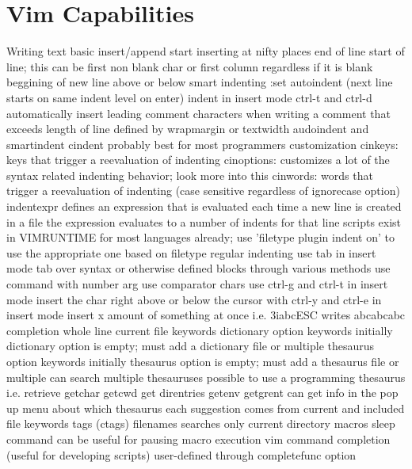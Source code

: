 \documentclass[12pt]{book}
\begin{document}
\section{Vim Capabilities}
Writing text
  basic insert/append
    start inserting at nifty places
      end of line
      start of line; this can be first non blank char or first column regardless if it is blank
      beggining of new line above or below
      smart indenting
        :set autoindent (next line starts on same indent level on enter)
        indent in insert mode ctrl-t and ctrl-d
        automatically insert leading comment characters when writing a comment that exceeds length of line defined by wrapmargin or textwidth
        audoindent and smartindent
        cindent
          probably best for most programmers
          customization
            cinkeys: keys that trigger a reevaluation of indenting
            cinoptions: customizes a lot of the syntax related indenting behavior; look more into this
            cinwords: words that trigger a reevaluation of indenting (case sensitive regardless of ignorecase option)
        indentexpr
          defines an expression that is evaluated each time a new line is created in a file
          the expression evaluates to a number of indents for that line
          scripts exist in VIMRUNTIME for most languages already; use 'filetype plugin indent on' to use the appropriate one based on filetype
      regular indenting
        use tab in insert mode
        tab over syntax or otherwise defined blocks through various methods
        use command with number arg
        use comparator chars
        use ctrl-g and ctrl-t in insert mode
    insert the char right above or below the cursor with ctrl-y and ctrl-e in insert mode
    insert x amount of something at once i.e. 3iabcESC writes abcabcabc
  completion
    whole line
    current file keywords
    dictionary option keywords
      initially dictionary option is empty; must add a dictionary file or multiple
    thesaurus option keywords
      initially thesaurus option is empty; must add a thesaurus file or multiple
      can search multiple thesauruses
      possible to use a programming thesaurus i.e. retrieve getchar getcwd get direntries getenv getgrent
      can get info in the pop up menu about which thesaurus each suggestion comes from
    current and included file keywords
    tags (ctags)
    filenames
      searches only current directory
    macros
      sleep command can be useful for pausing macro execution
    vim command completion (useful for developing scripts)
    user-defined through completefunc option
\end{document}
